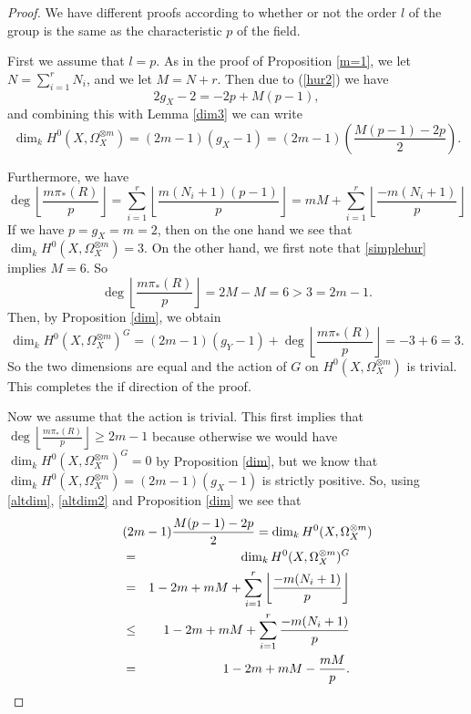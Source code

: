 \begin{proof}

    We have different proofs according to whether or not the order $l$ of the group is the same as the characteristic $p$ of the field.


	First we assume that $l=p$. 
	As in the proof of Proposition \ref{m=1}, we let $N=\sum_{i=1}^r N_i$, and we let $M=N+r$.
	Then due to (\ref{hur2}) we have
	\begin{equation}\label{simplehur}2g_X-2=-2p+M(p-1),\end{equation}
	and combining this with Lemma \ref{dim3} we can write
		\begin{equation}\label{altdim2}
		\dim_kH^0(X,\Omega_X^{\otimes m})=(2m-1)(g_X-1)=(2m-1)\left(\frac{M(p-1)-2p}{2}\right).
		\end{equation}

	Furthermore, we have
		\begin{equation}\label{altdim}
			\deg\left\lfloor \frac{m\pi_*(R)}{p} \right\rfloor = \sum_{i=1}^r\left\lfloor \frac{m(N_i+1)(p-1)}{p} \right\rfloor  = mM + \sum_{i=1}^r\left\lfloor \frac{-m(N_i+1)}{p} \right\rfloor
		\end{equation}
	If we have $p=g_X=m=2$, then on the one hand we see that $\dim_kH^0(X,\Omega_X^{\otimes m}) =3$. 
	On the other hand, we first note that \eqref{simplehur} implies $M=6$.
	So $$\deg\left\lfloor \frac{m\pi_*(R)}{p}\right\rfloor = 2M -M =6 > 3 = 2m-1.$$
	Then, by Proposition \ref{dim}, we obtain 
	$$\dim_kH^0(X,\Omega_X^{\otimes m})^G = (2m-1)(g_Y-1)+\deg\left\lfloor \frac{m\pi_*(R)}{p} \right\rfloor = -3 + 6 = 3.$$
	So the two dimensions are equal and the action of $G$ on $H^0(X,\Omega_X^{\otimes m})$ is trivial. 
	This completes the if direction of the proof.

	Now we assume that the action is trivial. This first implies that 
	$\deg \left\lfloor\frac{m\pi_*(R)}{p}\right\rfloor \geq 2m-1$ because otherwise we would 
	have $\dim_kH^0(X,\Omega_X^{\otimes m})^G=0$ by Proposition \ref{dim}, but we know that 
	$\dim_kH^0(X,\Omega_X^{\otimes m})=(2m-1)(g_X-1)$ is strictly positive. 
	So, using \eqref{altdim}, \eqref{altdim2} and Proposition \ref{dim} we see that
		\begin{eqnarray}\label{bound}
			\lefteqn{(2m-1)\frac{M(p-1)-2p}{2} = \dim_kH^0(X,\Omega_X^{\otimes m})} \nonumber\\
			& = & \dim_kH^0(X,\Omega_X^{\otimes m})^G \nonumber\\
			& = & 1-2m+mM+\sum_{i=1}^r\left\lfloor\frac{-m(N_i+1)}{p}\right\rfloor\nonumber \\
			& \leq & 1-2m+mM+\sum_{i=1}^r\frac{-m(N_i+1)}{p}\nonumber \\
			& = & 1-2m+mM-\frac{mM}{p}.
		\end{eqnarray}


\end{proof}
